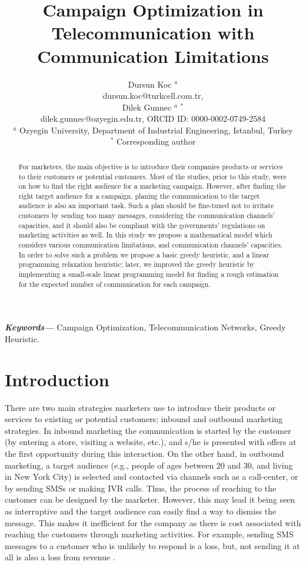 \documentclass[11pt]{article}
\title{Campaign Optimization in Telecommunication with Communication Limitations}
\author{Dursun Koc $^{a}$ \\ 
	dursun.koc@turkcell.com.tr, \\
	Dilek Gunnec $^{a}$ $^{\ast}$\\ 
	dilek.gunnec@ozyegin.edu.tr, ORCID ID: 0000-0002-0749-2584 \\
$^{a}$ Ozyegin University, Department of Industrial Engineering, Istanbul, Turkey \\ 
$^{\ast}$ Corresponding author \\ }
\date{}
\providecommand{\keywords}[1]
{
  \small	
  \textbf{\textit{Keywords---}} #1
}
\begin{document}
\maketitle
\begin{abstract}
For marketers, the main objective is to introduce their companies products or services to their customers or potential customers. Most of the studies, prior to this study, were on how to find the right audience for a marketing campaign. However, after finding the right target audience for a campaign, planing the communication to the target audience is also an important task. Such a plan should be fine-tuned not to irritate customers by sending too many messages, considering the communication channels' capacities, and it should also be compliant with the governments' regulations on marketing activities as well. In this study we propose a mathematical model which considers various communication limitations, and communication channels' capacities. In order to solve such a problem we propose a basic greedy heuristic, and a linear programming relaxation heuristic; later, we improved the greedy heuristic by implementing a small-scale linear programming model for finding a rough estimation for the expected number of communication for each campaign.\end{abstract}\hspace{10pt}

\keywords{Campaign Optimization, Telecommunication Networks, Greedy Heuristic.}

\newpage

\section{Introduction}

There are two main strategies marketers use to introduce their products or services to existing or potential customers; inbound and outbound marketing strategies. In inbound marketing the communication is started by the customer (by entering a store, visiting a website, etc.), and s/he is presented with offers at the first opportunity during this interaction. On the other hand, in outbound marketing, a target audience (e.g., people of ages between 20 and 30, and living in New York City) is selected and contacted via channels such as a call-center, or by sending SMSs or making IVR calls. Thus, the process of reaching to the customer can be designed by the marketer. However, this may lead it being seen as interruptive and the target audience can easily find a way to dismiss the message. This makes it inefficient for the company as there is cost associated with reaching the customers through marketing activities. For example, sending SMS messages to a customer who is unlikely to respond is a loss, but, not sending it at all is also a loss from revenue \citep{sarkar}.  
\end{document}
